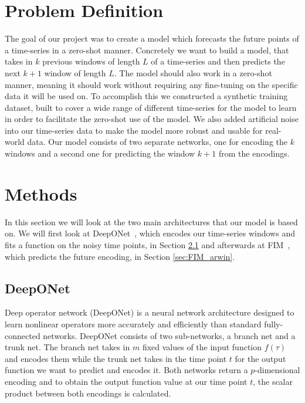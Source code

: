 \documentclass{article}
\theoremstyle{plain}
\theoremstyle{definition}
\theoremstyle{remark}
\begin{document}
\section{Problem Definition}
The goal of our project was to create a model which forecasts the future points of a time-series in a zero-shot manner. Concretely we want to build a model, that takes in $k$ previous windows of length $L$ of a time-series and then predicts the next $k+1$ window of length $L$. The model should also work in a zero-shot manner, meaning it should work without requiring any fine-tuning on the specific data it will be used on. To accomplish this we constructed a synthetic training dataset, built to cover a wide range of different time-series for the model to learn in order to facilitate the zero-shot use of the model. We also added artificial noise into our time-series data to make the model more robust and usable for real-world data. Our model consists  of two separate networks, one for encoding the $k$ windows and a second one for predicting the window $k+1$ from the encodings. 

\section{Methods}
In this section we will look at the two main architectures that our model is based on. We will first look at DeepONet~\cite{Deeponet}, which encodes our time-series windows and fits a function on the noisy time points, in Section \ref{sec:DeepONet} and afterwards at FIM~\cite{fim-l}, which predicts the future encoding, in Section \ref{sec:FIM_arwin}.

\subsection{DeepONet}\label{sec:DeepONet}
Deep operator network (DeepONet)\cite{Deeponet} is a neural network architecture designed to learn nonlinear operators more accurately and efficiently than standard fully-connected networks. DeepONet consists of two sub-networks, a branch net and a trunk net. The branch net takes in $m$ fixed values of the input function $f(\tau)$ and encodes them while the trunk net takes in the time point $t$ for the output function we want to predict and encodes it. Both networks return a $p$-dimensional encoding and to obtain the output function value at our time point $t$, the scalar product between both encodings is calculated.
\end{document}
